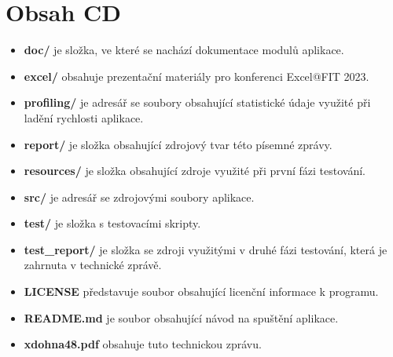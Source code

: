 
%



\chapter{Obsah CD}

\begin{itemize}
    \item \textbf{doc/} je složka, ve které se nachází dokumentace modulů aplikace.
    \item \textbf{excel/} obsahuje prezentační materiály pro konferenci Excel@FIT 2023.
    \item \textbf{profiling/} je adresář se soubory obsahující statistické údaje využité při ladění rychlosti aplikace.
    \item \textbf{report/} je složka obsahující zdrojový tvar této písemné zprávy.
    \item \textbf{resources/} je složka obsahující zdroje využité při první fázi testování.
    \item \textbf{src/} je adresář se zdrojovými soubory aplikace.
    \item \textbf{test/} je složka s testovacími skripty.
    \item \textbf{test\_report/} je složka se zdroji využitými v druhé fázi testování, která je zahrnuta v technické zprávě.
    \item \textbf{LICENSE} představuje soubor obsahující licenční informace k programu.
    \item \textbf{README.md} je soubor obsahující návod na spuštění aplikace.
    \item \textbf{xdohna48.pdf} obsahuje tuto technickou zprávu.
\end{itemize}


%
